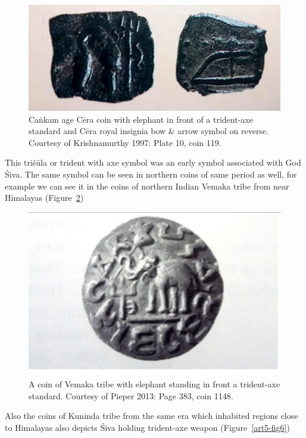\begin{figure}[H]
\includegraphics{"images/article-05/art05-fig04.jpg"}
\caption{Caṅkam age Cēra coin with elephant in front of a trident-axe standard and Cēra royal insignia bow \& arrow symbol on reverse. Courtesy of Krishnamurthy 1997: Plate 10, coin 119.}\label{art5-fig4}
\end{figure}

This triśūla or trident with axe symbol was an early symbol associated with God Śiva. The same symbol can be seen in northern coins of same period as well, for example we can see it in the coins of northern Indian Vemaka tribe from near Himalayas (Figure~\ref{art5-fig5})

\begin{figure}[!htbp]
\includegraphics{"images/article-05/art05-fig05.jpg"}
\caption{A coin of Vemaka tribe with elephant standing in front a trident-axe standard. Courtesy of Pieper 2013: Page 383, coin 1148.}\label{art5-fig5}
\end{figure}

Also the coins of Kuninda tribe from the same era which inhabited regions close to Himalayas also depicts Śiva holding trident-axe weapon (Figure~\ref{art5-fig6})

